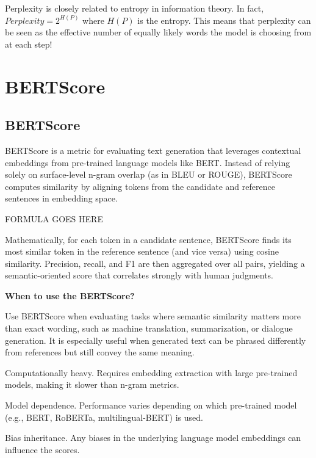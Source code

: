 \clearpage

\thispagestyle{customstyle}

{Perplexity is closely related to entropy in information theory. In fact, $Perplexity = 2^{H(P)}$
where \(H(P)\) is the entropy. This means that perplexity can be seen as the effective 
number of equally likely words the model is choosing from at each step!}

\clearpage
\thispagestyle{genaistyle}
\section{BERTScore}
\subsection{BERTScore}


BERTScore is a metric for evaluating text generation that leverages contextual embeddings from pre-trained language models like BERT.
Instead of relying solely on surface-level n-gram overlap (as in BLEU or ROUGE), BERTScore computes similarity by aligning tokens from the
candidate and reference sentences in embedding space.

\begin{center}
    FORMULA GOES HERE
\end{center}

Mathematically, for each token in a candidate sentence, BERTScore finds its most similar token in the reference sentence (and vice versa)
using cosine similarity. Precision, recall, and F1 are then aggregated over all pairs, yielding a semantic-oriented score that correlates
strongly with human judgments.

\textbf{When to use the BERTScore?}

Use BERTScore when evaluating tasks where semantic similarity matters more than exact wording, such as machine translation, summarization, or
dialogue generation. It is especially useful when generated text can be phrased differently from references but still convey the same meaning.

{
\item Computationally heavy. Requires embedding extraction with large pre-trained models, making it slower than n-gram metrics.
\item Model dependence. Performance varies depending on which pre-trained model (e.g., BERT, RoBERTa, multilingual-BERT) is used.
\item Bias inheritance. Any biases in the underlying language model embeddings can influence the scores.
}

